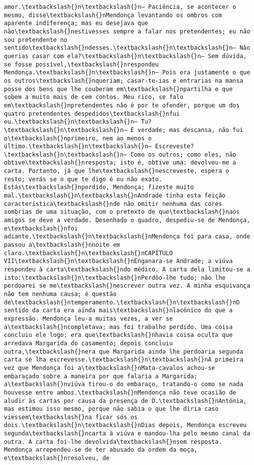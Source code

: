 \documentclass[11pt]{article}
\begin{document}
\begin{Verbatim}[commandchars=\\\{\}]
amor.\textbackslash{}n\textbackslash{}n— Paciência, se acontecer o mesmo, disse\textbackslash{}nMendonça levantando os ombros com aparente indiferença; mas eu desejava que não\textbackslash{}nestivesses sempre a falar nos pretendentes; eu não sou pretendente no sentido\textbackslash{}ndesses.\textbackslash{}n\textbackslash{}n— Não querias casar com ela?\textbackslash{}n\textbackslash{}n— Sem dúvida, se fosse possível,\textbackslash{}nrespondeu Mendonça.\textbackslash{}n\textbackslash{}n— Pois era justamente o que os outros\textbackslash{}nqueriam; casar-te-ias e entrarias na mansa posse dos bens que lhe couberam em\textbackslash{}npartilha e que sobem a muito mais de cem contos. Meu rico, se falo em\textbackslash{}npretendentes não é por te ofender, porque um dos quatro pretendentes despedidos\textbackslash{}nfui eu.\textbackslash{}n\textbackslash{}n— Tu?\textbackslash{}n\textbackslash{}n— É verdade; mas descansa, não fui o\textbackslash{}nprimeiro, nem ao menos o último.\textbackslash{}n\textbackslash{}n— Escreveste?\textbackslash{}n\textbackslash{}n— Como os outros; como eles, não obtive\textbackslash{}nresposta; isto é, obtive uma: devolveu-me a carta. Portanto, já que lhe\textbackslash{}nescreveste, espera o resto; verás se o que te digo é ou não exato. Estás\textbackslash{}nperdido, Mendonça; fizeste muito mal.\textbackslash{}n\textbackslash{}nAndrade tinha esta feição característica\textbackslash{}nde não omitir nenhuma das cores sombrias de uma situação, com o pretexto de que\textbackslash{}naos amigos se deve a verdade. Desenhado o quadro, despediu-se de Mendonça, e\textbackslash{}nfoi adiante.\textbackslash{}n\textbackslash{}nMendonça foi para casa, onde passou a\textbackslash{}nnoite em claro.\textbackslash{}n\textbackslash{}nCAPÍTULO VII\textbackslash{}n\textbackslash{}nEnganara-se Andrade; a viúva respondeu à carta\textbackslash{}ndo médico. A carta dela limitou-se a isto:\textbackslash{}n\textbackslash{}nPerdôo-lhe tudo; não lhe perdoarei se me\textbackslash{}nescrever outra vez. A minha esquivança não tem nenhuma causa; é questão de\textbackslash{}ntemperamento.\textbackslash{}n\textbackslash{}nO sentido da carta era ainda mais\textbackslash{}nlacônico do que a expressão. Mendonça leu-a muitas vezes, a ver se a\textbackslash{}ncompletava; mas foi trabalho perdido. Uma coisa concluiu ele logo; era que\textbackslash{}nhavia coisa oculta que arredava Margarida do casamento; depois concluiu outra,\textbackslash{}nera que Margarida ainda lhe perdoaria segunda carta se lha escrevesse.\textbackslash{}n\textbackslash{}nA primeira vez que Mendonça foi a\textbackslash{}nMata-cavalos achou-se embaraçado sobre a maneira por que falaria a Margarida; a\textbackslash{}nviúva tirou-o do embaraço, tratando-o como se nada houvesse entre ambos.\textbackslash{}nMendonça não teve ocasião de aludir às cartas por causa da presença de D.\textbackslash{}nAntônia, mas estimou isso mesmo, porque não sabia o que lhe diria caso viessem\textbackslash{}na ficar sós os dois.\textbackslash{}n\textbackslash{}nDias depois, Mendonça escreveu segunda\textbackslash{}ncarta à viúva e mandou-lha pelo mesmo canal da outra. A carta foi-lhe devolvida\textbackslash{}nsem resposta. Mendonça arrependeu-se de ter abusado da ordem da moça, e\textbackslash{}nresolveu, de 
\end{Verbatim}
\end{document}

